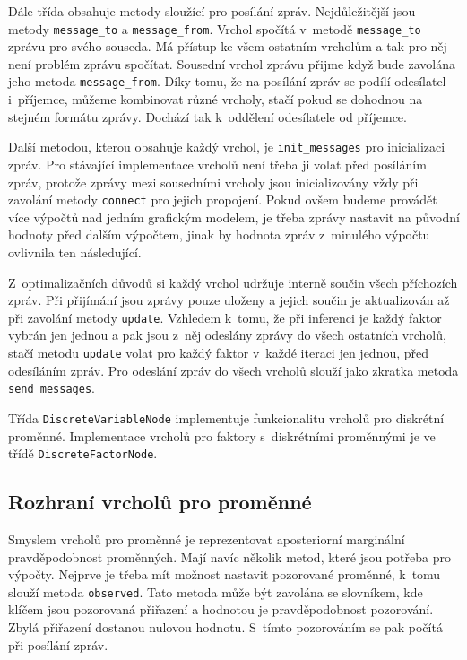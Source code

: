 Dále třída obsahuje metody sloužící pro posílání zpráv.
Nejdůležitější jsou metody \texttt{message\_to} a \texttt{message\_from}.
Vrchol spočítá v~metodě \texttt{message\_to} zprávu pro svého souseda.
Má přístup ke všem ostatním vrcholům a tak pro něj není problém zprávu spočítat.
Sousední vrchol zprávu přijme když bude zavolána jeho metoda \texttt{message\_from}.
Díky tomu, že na posílání zpráv se podílí odesílatel i~příjemce, můžeme kombinovat různé vrcholy, stačí pokud se dohodnou na stejném formátu zprávy.
Dochází tak k~oddělení odesílatele od příjemce.

Další metodou, kterou obsahuje každý vrchol, je \texttt{init\_messages} pro inicializaci zpráv. 
Pro stávající implementace vrcholů není třeba ji volat před posíláním zpráv, protože zprávy mezi sousedními vrcholy jsou inicializovány vždy při zavolání metody \texttt{connect} pro jejich propojení.
Pokud ovšem budeme provádět více výpočtů nad jedním grafickým modelem, je třeba zprávy nastavit na původní hodnoty před dalším výpočtem, jinak by hodnota zpráv z~minulého výpočtu ovlivnila ten následující.

Z~optimalizačních důvodů si každý vrchol udržuje interně součin všech příchozích zpráv.
Při přijímání jsou zprávy pouze uloženy a jejich součin je aktualizován až při zavolání metody \texttt{update}.
Vzhledem k~tomu, že při inferenci je každý faktor vybrán jen jednou a pak jsou z~něj odeslány zprávy do všech ostatních vrcholů, stačí metodu \texttt{update} volat pro každý faktor v~každé iteraci jen jednou, před odesíláním zpráv.
Pro odeslání zpráv do všech vrcholů slouží jako zkratka metoda \texttt{send\_messages}.

Třída \texttt{DiscreteVariableNode} implementuje funkcionalitu vrcholů pro diskrétní proměnné.
Implementace vrcholů pro faktory s~diskrétními proměnnými je ve třídě \texttt{DiscreteFactorNode}. 

\subsection{Rozhraní vrcholů pro proměnné}

Smyslem vrcholů pro proměnné je reprezentovat aposteriorní marginální pravděpodobnost proměnných.
Mají navíc několik metod, které jsou potřeba pro výpočty.
Nejprve je třeba mít možnost nastavit pozorované proměnné, k~tomu slouží metoda \texttt{observed}.
Tato metoda může být zavolána se slovníkem, kde klíčem jsou pozorovaná přiřazení a hodnotou je pravděpodobnost pozorování.
Zbylá přiřazení dostanou nulovou hodnotu.
S~tímto pozorováním se pak počítá při posílání zpráv.

